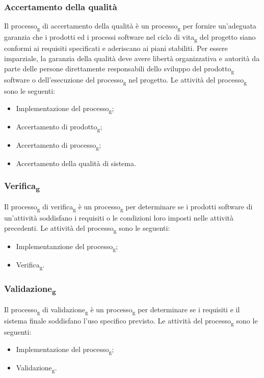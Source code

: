 \subsubsection{Accertamento della qualità}
Il processo\textsubscript{g} di accertamento della qualità è un processo\textsubscript{g} per fornire un'adeguata garanzia che i prodotti ed i processi software nel ciclo di vita\textsubscript{g} del progetto siano conformi ai requisiti specificati e aderiscano ai piani stabiliti. Per essere imparziale, la garanzia della qualità deve avere libertà organizzativa e autorità da parte delle persone direttamente responsabili dello sviluppo del prodotto\textsubscript{g} software o dell'esecuzione del processo\textsubscript{g} nel progetto.
Le attività del processo\textsubscript{g} sono le seguenti:
\begin{itemize}
\item Implementazione del processo\textsubscript{g};
\item Accertamento di prodotto\textsubscript{g};
\item Accertamento di processo\textsubscript{g};
\item Accertamento della qualità di sistema.
\end{itemize}
\subsubsection{Verifica\textsubscript{g}}
Il processo\textsubscript{g} di verifica\textsubscript{g} è un processo\textsubscript{g} per determinare se i prodotti software di un'attività soddisfano i requisiti o le condizioni loro imposti nelle attività precedenti.
Le attività del processo\textsubscript{g} sono le seguenti:
\begin{itemize}
\item Implementanzione del processo\textsubscript{g};
\item Verifica\textsubscript{g}.
\end{itemize}
\subsubsection{Validazione\textsubscript{g}}
Il processo\textsubscript{g} di validazione\textsubscript{g} è un processo\textsubscript{g} per determinare se i requisiti e il sistema finale soddisfano l'uso specifico previsto.
Le attività del processo\textsubscript{g} sono le seguenti:
\begin{itemize}
\item Implementazione del processo\textsubscript{g};
\item Validazione\textsubscript{g}.
\end{itemize}

